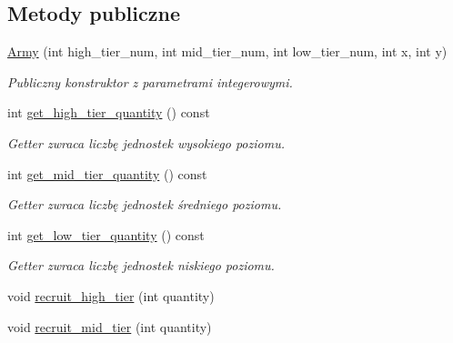 \subsection*{Metody publiczne}
\begin{DoxyCompactItemize}
\item 
\hyperlink{classmodel_1_1Army_a09146560c4983f1d478cd490cc266333}{Army} (int high\+\_\+tier\+\_\+num, int mid\+\_\+tier\+\_\+num, int low\+\_\+tier\+\_\+num, int x, int y)
\begin{DoxyCompactList}\small\item\em Publiczny konstruktor z parametrami integerowymi. \end{DoxyCompactList}\item 
\mbox{\label{classmodel_1_1Army_a81ae7bf335912170e9330ef27df6a450}} 
int \hyperlink{classmodel_1_1Army_a81ae7bf335912170e9330ef27df6a450}{get\+\_\+high\+\_\+tier\+\_\+quantity} () const
\begin{DoxyCompactList}\small\item\em Getter zwraca liczbę jednostek wysokiego poziomu. \end{DoxyCompactList}\item 
\mbox{\label{classmodel_1_1Army_a6845db50342d69bdcef1a215913fe316}} 
int \hyperlink{classmodel_1_1Army_a6845db50342d69bdcef1a215913fe316}{get\+\_\+mid\+\_\+tier\+\_\+quantity} () const
\begin{DoxyCompactList}\small\item\em Getter zwraca liczbę jednostek średniego poziomu. \end{DoxyCompactList}\item 
\mbox{\label{classmodel_1_1Army_a46ee43ae22033531d863801698370944}} 
int \hyperlink{classmodel_1_1Army_a46ee43ae22033531d863801698370944}{get\+\_\+low\+\_\+tier\+\_\+quantity} () const
\begin{DoxyCompactList}\small\item\em Getter zwraca liczbę jednostek niskiego poziomu. \end{DoxyCompactList}\item 
void \hyperlink{classmodel_1_1Army_aad5caea451cef381210253fa32b70089}{recruit\+\_\+high\+\_\+tier} (int quantity)
\item 
void \hyperlink{classmodel_1_1Army_a30f4b8e102f400969a86bebbfeb9bbb3}{recruit\+\_\+mid\+\_\+tier} (int quantity)

\end{DoxyCompactItemize}
